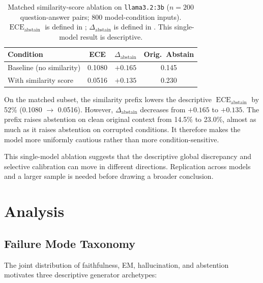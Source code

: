 \documentclass[11pt]{article}
\begin{document}
\begin{table}[htbp]
\centering
\caption{Matched similarity-score ablation on \texttt{llama3.2:3b} ($n=200$
  question-answer pairs; 800 model-condition inputs). $\operatorname{ECE}_{\mathrm{abstain}}$
  is defined in ; $\Delta_\text{abstain}$ is defined in .
  This single-model result is descriptive.}
\label{tab:similarity-ablation}
\begin{tabular}{lccc}
\toprule
\textbf{Condition} & \textbf{ECE} & $\Delta_\text{abstain}$ & \textbf{Orig.\ Abstain} \\
\midrule
Baseline (no similarity) & 0.1080 & $+0.165$ & 0.145 \\
With similarity score    & 0.0516 & $+0.135$ & 0.230 \\
\bottomrule
\end{tabular}
\end{table}

On the matched subset, the similarity prefix lowers the descriptive
$\operatorname{ECE}_{\mathrm{abstain}}$ by 52\% (0.1080 $\to$ 0.0516). However,
$\Delta_\text{abstain}$ decreases from $+0.165$ to $+0.135$. The prefix raises abstention
on clean original context from 14.5\% to 23.0\%, almost as much as it raises abstention on
corrupted conditions. It therefore makes the model more uniformly cautious rather than
more condition-sensitive.

This single-model ablation suggests that the descriptive global discrepancy and selective
calibration can move in different directions. Replication across models and a larger sample
is needed before drawing a broader conclusion.
\FloatBarrier
\section{Analysis}
\label{sec:analysis}

\subsection{Failure Mode Taxonomy}

The joint distribution of faithfulness, EM, hallucination, and abstention motivates three
descriptive generator archetypes:
\end{document}
